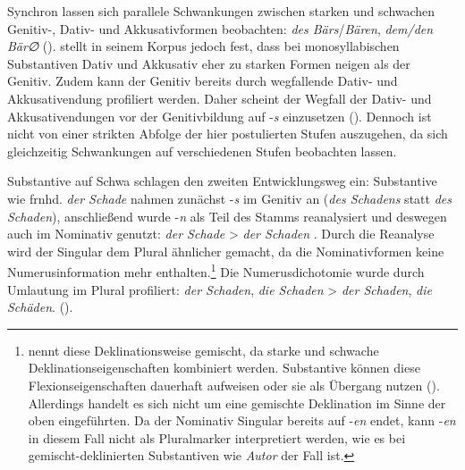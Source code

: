 Synchron lassen sich parallele Schwankungen zwischen starken und schwachen Genitiv-, Dativ- und Akkusativformen beobachten: \textit{des Bärs}/\textit{Bären}, \textit{dem/den Bär∅} (\cite[70--72]{Krischke.2012}). \textcite[402]{Schafer.2019} stellt in seinem Korpus jedoch fest, dass bei monosyllabischen Substantiven Dativ und Akkusativ eher zu starken Formen neigen als der Genitiv. Zudem kann der Genitiv bereits durch wegfallende Dativ- und Akkusativendung profiliert werden. Daher scheint der Wegfall der Dativ- und Akkusativendungen vor der Genitivbildung auf -\textit{s} einzusetzen (\cite[396]{Schafer.2019}). Dennoch ist nicht von einer strikten Abfolge der hier postulierten Stufen auszugehen, da sich gleichzeitig Schwankungen auf verschiedenen Stufen beobachten lassen.\largerpage



Substantive auf Schwa schlagen den zweiten Entwicklungsweg ein: Substantive wie frnhd. \textit{der Schade} nahmen zunächst -\textit{s} im Genitiv an (\textit{des Schadens} statt \textit{des Schaden}), anschließend wurde -\textit{n} als Teil des Stamms reanalysiert und deswegen auch im Nominativ genutzt: \textit{der Schade} > \textit{der Schaden} \parencites[172]{Kopcke.1995}[113--114]{Kopcke.2000}. Durch die Reanalyse wird der Singular dem Plural ähnlicher gemacht, da die Nominativformen keine Numerusinformation mehr enthalten.\footnote{\textcite[305]{Nubling.2008} nennt diese Deklinationsweise gemischt, da starke und schwache Deklinationseigenschaften kombiniert werden. Substantive können diese Flexionseigenschaften dauerhaft aufweisen oder sie als Übergang nutzen (\cite[305]{Nubling.2008}). Allerdings handelt es sich nicht um eine gemischte Deklination im Sinne der oben eingeführten. Da der Nominativ Singular bereits auf -\textit{en} endet, kann -\textit{en} in diesem Fall nicht als Pluralmarker interpretiert werden, wie es bei gemischt-deklinierten Substantiven wie \textit{Autor} der Fall ist.} Die Numerusdichotomie wurde durch Umlautung im Plural profiliert: \textit{der Schaden}, \textit{die Schaden} > \textit{der Schaden}, \textit{die Schäden}. (\cite[70]{Nubling.2017}). 

 

